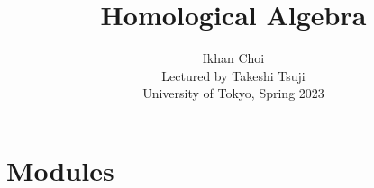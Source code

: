 \documentclass{../../small}
\begin{document}
\title{Homological Algebra}
\author{Ikhan Choi\\Lectured by Takeshi Tsuji\\University of Tokyo, Spring 2023}
\maketitle
\tableofcontents

\newpage
\section{Modules}
\end{document}
